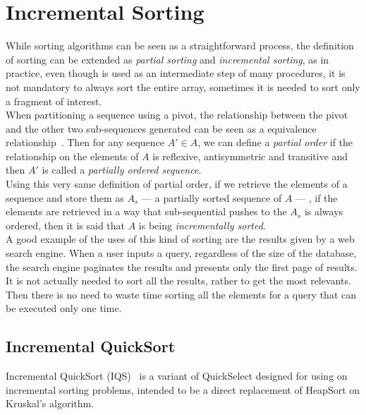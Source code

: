
\section{Incremental Sorting}
\label{SEC:INCREMENTAL_SORTING}

While sorting algorithms can be seen as a straightforward process, the definition of sorting can be extended as \textit{partial sorting} and \textit{incremental sorting}, as in practice, even though is used as an intermediate step of many procedures, it is not mandatory to always sort the entire array, sometimes it is needed to sort only a fragment of interest.\\

When partitioning a sequence using a pivot, the relationship between the pivot and the other two sub-sequences generated can be seen as a equivalence relationship~\cite{10.5555/1614191}. Then for any sequence $A' \in A$, we can define a \textit{partial order} if the relationship on the elements of $A$ is reflexive, antisymmetric and transitive and then $A'$ is called a \textit{partially ordered sequence}.\\

Using this very same definition of partial order, if we retrieve the elements of a sequence and store them as $A_s$ --- a partially sorted sequence of $A$ --- , if the elements are retrieved in a way that sub-sequential pushes to the $A_s$ is always ordered, then it is said that $A$ is being \textit{incrementally sorted}.\\

A good example of the uses of this kind of sorting are the results given by a web search engine. When a user inputs a query, regardless of the size of the database, the search engine paginates the results and presents only the first page of results. It is not actually needed to sort all the results, rather to get the most relevants. Then there is no need to waste time sorting all the elements for a query that can be executed only one time.\\

\subsection{Incremental QuickSort}
Incremental QuickSort (IQS)~\cite{Navarro_Paredes_2010} is a variant of QuickSelect designed for using on incremental sorting problems, intended to be a direct replacement of HeapSort on Kruskal's algorithm.\\

